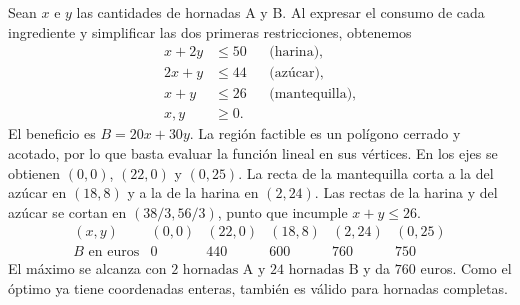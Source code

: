 Sean $x$ e $y$ las cantidades de hornadas A y B. Al expresar el consumo de cada ingrediente y simplificar las dos primeras restricciones, obtenemos
\[
 \begin{aligned}
 x+2y&\le50 &&\text{(harina)},\\
 2x+y&\le44 &&\text{(azúcar)},\\
 x+y&\le26 &&\text{(mantequilla)},\\
 x,y&\ge0.
 \end{aligned}
\]
El beneficio es $B=20x+30y$. La región factible es un polígono cerrado y acotado, por lo que basta evaluar la función lineal en sus vértices. En los ejes se obtienen $(0,0)$, $(22,0)$ y $(0,25)$. La recta de la mantequilla corta a la del azúcar en $(18,8)$ y a la de la harina en $(2,24)$. Las rectas de la harina y del azúcar se cortan en $(38/3,56/3)$, punto que incumple $x+y\le26$.
\[
 \begin{array}{c|rrrrr}
 (x,y)&(0,0)&(22,0)&(18,8)&(2,24)&(0,25)\\
 B\text{ en euros}&0&440&600&760&750
 \end{array}
\]
El máximo se alcanza con $\boxed{2\text{ hornadas A y }24\text{ hornadas B}}$ y da $760$ euros. Como el óptimo ya tiene coordenadas enteras, también es válido para hornadas completas.
